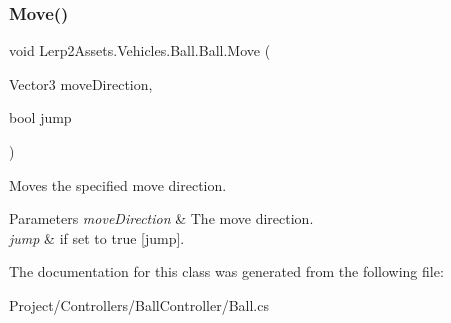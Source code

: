 \subsubsection{\texorpdfstring{Move()}{Move()}}
{\footnotesize\ttfamily void Lerp2\+Assets.\+Vehicles.\+Ball.\+Ball.\+Move (\begin{DoxyParamCaption}\item[{Vector3}]{move\+Direction,  }\item[{bool}]{jump }\end{DoxyParamCaption})\hspace{0.3cm}{\ttfamily [inline]}}



Moves the specified move direction. 


\begin{DoxyParams}{Parameters}
{\em move\+Direction} & The move direction.\\
\hline
{\em jump} & if set to {\ttfamily true} \mbox{[}jump\mbox{]}.\\
\hline
\end{DoxyParams}


The documentation for this class was generated from the following file\+:\begin{DoxyCompactItemize}
\item 
Project/\+Controllers/\+Ball\+Controller/Ball.\+cs\end{DoxyCompactItemize}
